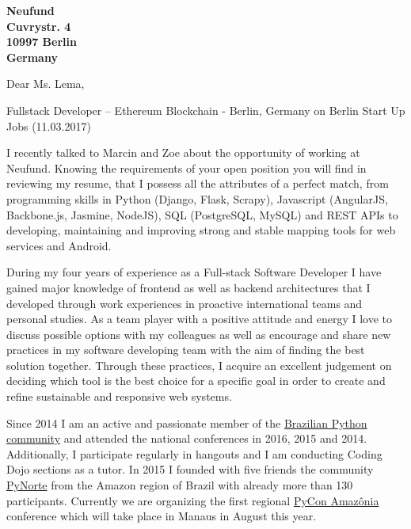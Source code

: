 \documentclass[a4paper]{joaosoares-letter}
\begin{document}
\longindentation=0pt


\begin{letter}{\bfseries Neufund\\Cuvrystr. 4\\10997 Berlin\\Germany}
 

\date{Belém, \today}

\opening{Dear Ms. Lema,}{Fullstack Developer – Ethereum Blockchain - Berlin, Germany on Berlin Start Up Jobs (11.03.2017)
}

I recently talked to Marcin and Zoe about the opportunity of working at Neufund. Knowing the requirements of your open position you will find in reviewing my resume, that I possess all the attributes of a perfect match, from programming skills in Python (Django, Flask, Scrapy), Javascript (AngularJS, Backbone.js, Jasmine, NodeJS), SQL (PostgreSQL, MySQL) and REST APIs to developing, maintaining and improving strong and stable mapping tools for web services and Android.

During my four years of experience as a Full-stack Software Developer I have gained major knowledge of frontend as well as backend architectures that I developed through work experiences in proactive international teams and personal studies. As a team player with a positive attitude and energy I love to discuss possible options with my colleagues as well as encourage and share new practices in my software developing team with the aim of finding the best solution together. Through these practices, I acquire an excellent judgement on deciding which tool is the best choice for a specific goal in order to create and refine sustainable and responsive web systems.

Since 2014 I am an active and passionate member of the \href{http://python.org.br}{Brazilian Python community} and attended the national conferences in 2016, 2015 and 2014. Additionally, I participate regularly in hangouts and I am conducting Coding Dojo sections as a tutor. In 2015 I founded with five friends the community \href{http://pynorte.python.org.br}{PyNorte} from the Amazon region of Brazil with already more than 130 participants. Currently we are organizing the first regional \href{http://amazonia.python.org.br/}{PyCon Amazônia} conference which will take place in Manaus in August this year.


\end{letter}
\end{document}
